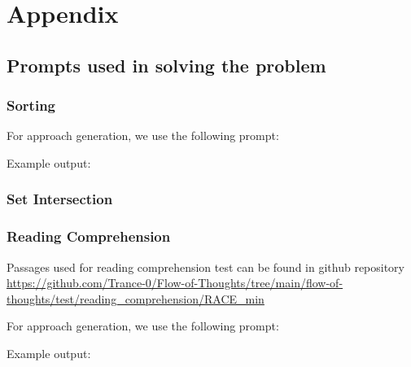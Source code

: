 \documentclass{article}
\begin{document}
\medskip
{
\small
{}

}

\section{Appendix}

\subsection{Prompts used in solving the problem}

\subsubsection{Sorting}

For approach generation, we use the following prompt:

Example output:

\subsubsection{Set Intersection}

\subsubsection{Reading Comprehension}

Passages used for reading comprehension test can be found in github repository \url{https://github.com/Trance-0/Flow-of-Thoughts/tree/main/flow-of-thoughts/test/reading_comprehension/RACE_min}

For approach generation, we use the following prompt:

Example output:
\end{document}
